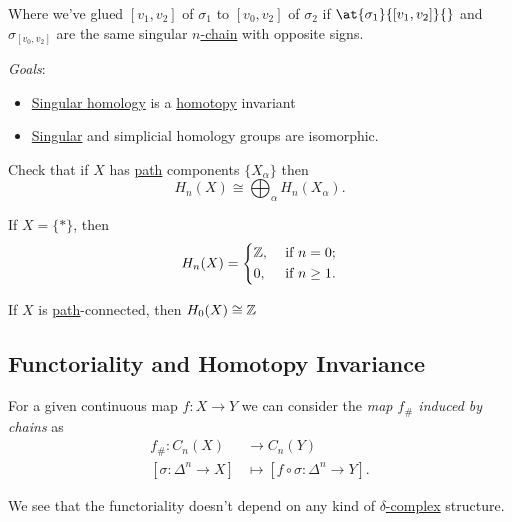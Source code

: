 Where we've glued $[v_1, v_2]$ of $\sigma_1$ to $[v_0, v_2]$ of $\sigma_2$ if $\at{\sigma_1}{[v_1, v_2]}{}$ and $\sigma_{[v_0, v_2]}$ are the same singular \hyperref[def:chain-group]{\(n\)-chain}
with opposite signs.

\emph{Goals}:
\begin{itemize}
	\item \hyperref[def:singular-homology-group]{Singular homology} is a \hyperref[def:homotopy]{homotopy} invariant
	\item \hyperref[def:singular-homology-group]{Singular} and simplicial homology groups are isomorphic.
\end{itemize}

\begin{exercise}
	Check that if \(X\) has \hyperref[def:path]{path} components \(\{X_\alpha\}\) then
	\[
		H_n(X) \cong \bigoplus_\alpha H_n(X_\alpha).
	\]
\end{exercise}

\begin{exercise}
	If \(X = \{\ast\}\), then
	\[
		H_n(X) = \begin{dcases}
			\mathbb{\MakeUppercase{z}}, & \text{ if } n=0 ;     \\
			0,                          & \text{ if } n\geq 1 .
		\end{dcases}
	\]
\end{exercise}

\begin{exercise}
	If \(X\) is \hyperref[def:path]{path}-connected, then $H_0(X) \cong \mathbb{\MakeUppercase{z}} $
\end{exercise}

\subsection{Functoriality and Homotopy Invariance}
\begin{definition}\label{def:induced-map-on-chains}
	For a given continuous map $f \colon X \to Y$ we can consider the \emph{map \(f_{\#}\) induced by chains} as
	\begin{align*}
		f_{\#} \colon C_n(X)           & \to C_n(Y)                                      \\
		[\sigma \colon \Delta^n \to X] & \mapsto [f \circ \sigma \colon \Delta^n \to Y].
	\end{align*}
\end{definition}
\begin{remark}
	We see that the functoriality doesn't depend on any kind of \hyperref[def:delta-complex]{\(\delta \)-complex} structure.
\end{remark}

